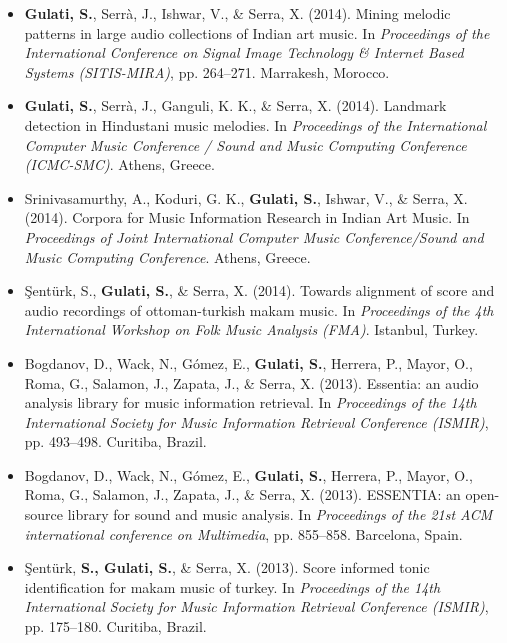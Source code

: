 \begin{itemize}[leftmargin=*]
	\item \textbf{Gulati, S.},  Serr{\`a}, J., Ishwar, V., \& Serra, X. (2014). Mining melodic patterns in large audio collections of Indian art music. In \textit{Proceedings of the International Conference on Signal Image Technology \& Internet Based Systems (SITIS-MIRA)}, pp. 264–271. Marrakesh, Morocco.
	\item \textbf{Gulati, S.}, Serr{\`a}, J., Ganguli, K. K., \& Serra, X. (2014). Landmark detection in Hindustani music melodies. In \textit{Proceedings of the International Computer Music Conference / Sound and Music Computing Conference (ICMC-SMC)}. Athens, Greece. 
	\item Srinivasamurthy, A., Koduri, G. K., \textbf{Gulati, S.}, Ishwar, V., \& Serra, X. (2014). Corpora for Music Information Research in Indian Art Music. In \textit{Proceedings of Joint International Computer Music Conference/Sound and Music Computing Conference}. Athens, Greece. 
	\item \c{S}ent{\"u}rk, S., \textbf{Gulati, S.}, \& Serra, X. (2014). Towards alignment of score and audio recordings of ottoman-turkish makam music. In \textit{Proceedings of the 4th International Workshop on Folk Music Analysis (FMA)}. Istanbul, Turkey. 
	\item Bogdanov, D., Wack, N., G{\'o}mez, E., \textbf{Gulati, S.}, Herrera, P., Mayor, O., Roma, G., Salamon, J., Zapata, J., \& Serra, X. (2013). Essentia: an audio analysis library for music information retrieval. In \textit{Proceedings of the 14th International Society for Music Information Retrieval Conference (ISMIR)}, pp. 493–498. Curitiba, Brazil.
	\item Bogdanov, D., Wack, N., G{\'o}mez, E., \textbf{Gulati, S.}, Herrera, P., Mayor, O., Roma, G., Salamon, J., Zapata, J., \& Serra, X. (2013). ESSENTIA: an open-source library for sound and music analysis. In \textit{Proceedings of the 21st ACM international conference on Multimedia}, pp. 855–858. Barcelona, Spain.
	\item \c{S}ent{\"u}rk, \textbf{S., Gulati, S.}, \& Serra, X. (2013). Score informed tonic identification for makam music of turkey. In \textit{Proceedings of the 14th International Society for Music Information Retrieval Conference (ISMIR)}, pp. 175–180. Curitiba, Brazil.

\end{itemize}
